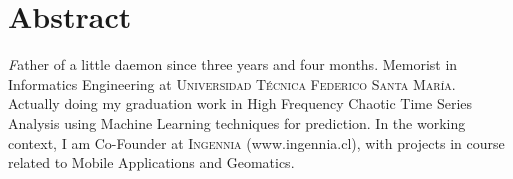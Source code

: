 
\section*{\textbf{Abstract}}
	\textsl
	Father of a little daemon since three years and four months. Memorist in Informatics Engineering at \textsc{Universidad Técnica Federico Santa María}.
	Actually doing my graduation work in High Frequency Chaotic Time Series Analysis using Machine Learning techniques for prediction.
	In the working context, I am Co-Founder at \textsc{Ingennia} (www.ingennia.cl), with projects in course related to Mobile Applications and Geomatics.
    \newline
